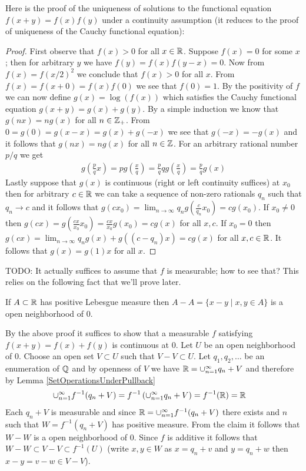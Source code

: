 Here is the proof of the uniqueness of solutions to  the functional equation $f(x+y) = f(x) f(y)$ under a continuity assumption (it reduces to the proof of uniqueness of the Cauchy functional equation):
\begin{proof}
First observe that $f(x) > 0$ for all $x \in \mathbb{R}$.  Suppose $f(x) = 0$ for some $x$; then for arbitrary $y$ we have $f(y) = f(x) f(y - x) = 0$.  Now from 
$f(x) = f(x/2)^2$ we conclude that $f(x) > 0$ for all $x$.  From $f(x) = f(x+0) = f(x) f(0)$ we see that $f(0) = 1$.
By the positivity of $f$ we can now define $g(x) = \log (f(x))$ which satisfies the Cauchy functional equation $g(x+y) = g(x) + g(y)$.  
By a simple induction we know that $g(nx) = ng(x)$ for all $n \in \mathbb{Z}_+$.  From $0 = g(0) = g(x - x) = g(x) + g(-x)$ we see that $g(-x) = -g(x)$ and it follows that $g(nx) = n g(x)$ for all $n \in \mathbb{Z}$.  For an arbitrary rational number $p/q$ we get 
\begin{align*}
g(\frac{p}{q} x) = p g(\frac{x}{q}) = \frac{p}{q} q g(\frac{x}{q}) = \frac{p}{q} g(x)
\end{align*}
Lastly suppose that $g(x)$ is continuous (right or left continuity suffices) at $x_0$ then for arbitrary $c \in \mathbb{R}$ we can take a sequence of non-zero rationals $q_n$ such that $q_n \to c$ and it follows that $g(cx_0) = \lim_{n \to \infty} q_n g(\frac{c}{q_n} x_0) = c g(x_0)$.    If $x_0 \neq 0$ then $g(cx) = g(\frac{cx}{x_0} x_0) = \frac{cx}{x_0} g(x_0) = cg(x)$ for all $x, c$.  If $x_0 = 0$ then $g(c x) = \lim_{n \to \infty} q_n g(x) + g((c-q_n) x) = c g(x)$ for all $x,c \in \mathbb{R}$.  It follows that $g(x) = g(1) x$ for all $x$.
\end{proof}

TODO: It actually suffices to assume that $f$ is measurable; how to see that?
This relies on the following fact that we'll prove later.
\begin{clm}If $A \subset \mathbb{R}$ has positive Lebesgue measure then $A - A = \lbrace x - y \mid x,y \in A \rbrace$ is a open neighborhood of $0$.
\end{clm}

By the above proof it suffices to show that a measurable $f$ satisfying $f(x+y) = f(x) + f(y)$ is continuous at $0$. Let $U$ be an open neighborhood of $0$.  Choose an open set $V \subset U$ such that $V - V \subset U$.  Let $q_1, q_2, \dotsc$ be an enumeration of $\mathbb{Q}$ and by openness of $V$ we have $\mathbb{R} = \cup_{n=1}^\infty q_n + V$ and therefore by Lemma \ref{SetOperationsUnderPullback} 
\begin{align*}
\cup_{n=1}^\infty f^{-1}(q_n + V) &= f^{-1} \left(\cup_{n=1}^\infty q_n + V \right ) = f^{-1}(\mathbb{R}) = \mathbb{R}
\end{align*}
Each $q_n + V$ is measurable and since  $\mathbb{R} =\cup_{n=1}^\infty f^{-1}(q_n + V)$ there exists and $n$ such that $W =  f^{-1}(q_n + V)$ has positive measure.  From the claim it follows that $W - W$ is a open neighborhood of $0$.  Since $f$ is additive it follows that $W-W \subset V - V \subset f^{-1}(U)$ (write $x,y \in W$ as $x=q_n+v$ and $y=q_n+w$ then $x-y=v-w \in V - V$).  

